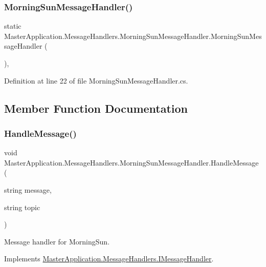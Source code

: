 \subsubsection{\texorpdfstring{Morning\+Sun\+Message\+Handler()}{MorningSunMessageHandler()}}
{\footnotesize\ttfamily static Master\+Application.\+Message\+Handlers.\+Morning\+Sun\+Message\+Handler.\+Morning\+Sun\+Message\+Handler (\begin{DoxyParamCaption}{ }\end{DoxyParamCaption})\hspace{0.3cm}{\ttfamily [static]}, {\ttfamily [private]}}



Definition at line 22 of file Morning\+Sun\+Message\+Handler.\+cs.



\subsection{Member Function Documentation}
\mbox{\label{class_master_application_1_1_message_handlers_1_1_morning_sun_message_handler_a0e70245da3c7203ab5d1049fe0286c9f}} 
\subsubsection{\texorpdfstring{Handle\+Message()}{HandleMessage()}}
{\footnotesize\ttfamily void Master\+Application.\+Message\+Handlers.\+Morning\+Sun\+Message\+Handler.\+Handle\+Message (\begin{DoxyParamCaption}\item[{string}]{message,  }\item[{string}]{topic }\end{DoxyParamCaption})}



Message handler for Morning\+Sun. 



Implements \mbox{\hyperlink{interface_master_application_1_1_message_handlers_1_1_i_message_handler_ada3ca8e0f5f2801663822849a2cfdf40}{Master\+Application.\+Message\+Handlers.\+I\+Message\+Handler}}.



